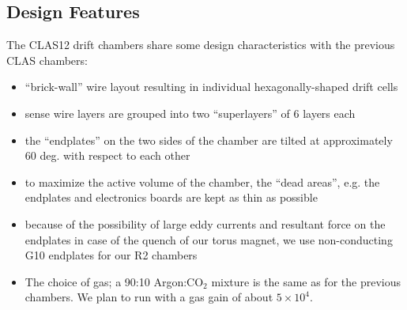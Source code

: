 \subsection{Design Features}
The CLAS12 drift chambers share some design characteristics with the
previous CLAS chambers:
\begin{itemize}
\item ``brick-wall'' wire layout resulting in individual hexagonally-shaped
drift cells
\item sense wire layers are grouped into two ``superlayers'' of 6 layers each
\item the ``endplates'' on the two sides of the chamber are tilted 
at approximately 60 deg. with respect to each other
\item to maximize the active volume of the chamber, the ``dead areas'', e.g.
the endplates and electronics boards are kept as thin as possible
\item because of the possibility of large eddy currents and resultant
force on the endplates in case of the quench of our torus magnet, we
use non-conducting G10 endplates for our R2 chambers
\item The choice of gas; a 90:10 Argon:CO$_2$ mixture is the same
as for the previous chambers.  We plan to run with a gas gain of 
about $5 \times 10^4$.
\end{itemize}


